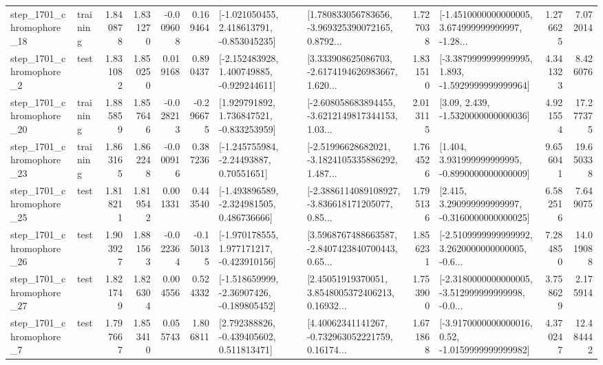 \begin{tabular}{llrrrrllrlrr}
 step\_1701\_chromophore\_18 &  training &      1.840878 &    1.831270 &     -0.009608 &  0.169464 &   [-1.021050455, 2.418613791, -0.853045235] &  [1.780833056783656, -3.969325390072165, 0.8792... &       1.727038 &  [-1.4510000000000005, 3.674999999999997, -1.28... &            1.276625 &          7.072014 \\
  step\_1701\_chromophore\_2 &      test &      1.831082 &    1.850250 &      0.019168 &  0.890437 &   [-2.152483928, 1.400749885, -0.929244611] &  [3.333908625086703, -2.6174194626983667, 1.620... &       1.831510 &  [-3.3879999999999995, 1.893, -1.5929999999999964] &            4.341323 &          8.426076 \\
 step\_1701\_chromophore\_20 &  training &      1.885859 &    1.857646 &     -0.028213 & -0.296675 &    [1.929791892, 1.736847521, -0.833253959] &  [-2.608058683894455, -3.6212149817344153, 1.03... &       2.013115 &                 [3.09, 2.439, -1.5320000000000036] &            4.921554 &         17.277375 \\
 step\_1701\_chromophore\_23 &  training &      1.863165 &    1.862248 &     -0.000916 &  0.387236 &     [-1.245755984, -2.24493887, 0.70551651] &  [-2.51996628682021, -3.1824105335886292, 1.487... &       1.764526 &    [1.404, 3.931999999999995, -0.8990000000000009] &            9.656041 &         19.650338 \\
 step\_1701\_chromophore\_25 &      test &      1.818211 &    1.819542 &      0.001331 &  0.443540 &   [-1.493896589, -2.324981505, 0.486736666] &  [-2.3886114089108927, -3.836618171205077, 0.85... &       1.795136 &    [2.415, 3.290999999999997, -0.3160000000000025] &            6.582516 &          7.649075 \\
 step\_1701\_chromophore\_26 &      test &      1.903927 &    1.881563 &     -0.022364 & -0.150135 &   [-1.970178555, 1.977171217, -0.423910156] &  [3.5968767488663587, -2.8407423840700443, 0.65... &       1.856231 &  [-2.5109999999999992, 3.2620000000000005, -0.6... &            7.284850 &         14.019088 \\
 step\_1701\_chromophore\_27 &      test &      1.821749 &    1.826304 &      0.004556 &  0.524332 &   [-1.518659999, -2.36907426, -0.189805452] &  [2.45051919370051, 3.8548005372406213, 0.16932... &       1.753900 &  [-2.3180000000000005, -3.512999999999998, -0.0... &            3.758629 &          2.175914 \\
  step\_1701\_chromophore\_7 &      test &      1.797667 &    1.853410 &      0.055743 &  1.806811 &    [2.792388826, -0.439405602, 0.511813471] &  [4.40062341141267, -0.732963052221759, 0.16174... &       1.671868 &   [-3.9170000000000016, 0.52, -1.0159999999999982] &            4.370247 &         12.484442 \\

\end{tabular}

